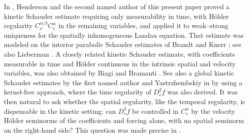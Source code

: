 \documentclass[10pt,a4paper]{amsart}
\numberwithin{equation}{section}
\begin{document}
In \cite{HW}, Henderson and the second named author of this present paper proved a kinetic
Schauder estimate requiring only measurability in time, with H\"older
regularity \(C_x^{\alpha/3}C_v^\alpha\) in the remaining variables,
and applied it to weak--strong uniqueness for the spatially
inhomogeneous Landau equation.  That estimate was modeled on the
interior parabolic Schauder estimates of Brandt \cite{Brandt} and
Knerr \cite{Knerr}; see also Lieberman \cite{Lieberman}.  A closely
related kinetic Schauder estimate, with coefficients measurable in
time and H\"older continuous in the intrinsic spatial {and velocity} variables, was
also obtained by Biagi and Bramanti \cite{BiagiBramanti}.  {See also a global kinetic Schauder estimates by the first named author and Yastrzhembskiy in \cite{DongYastrzhembskiySchauder} by using a kernel-free approach, where the time regularity of $D_v^2 f$ was also derived.}
It was then natural to ask whether the spatial regularity, like the temporal
regularity, is dispensable in the kinetic setting: can \(D_v^2 f\) be
controlled in \(C_v^\alpha\) by the velocity H\"older seminorms of the
coefficients and forcing alone, with no spatial seminorm on the
right-hand side?  This question was made precise in \cite[Conjecture~1.3]{HW}.
\end{document}
